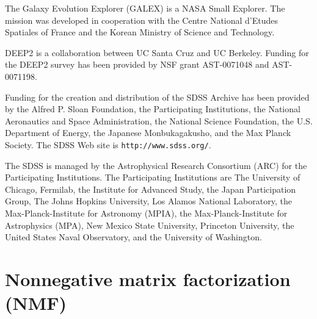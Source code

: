 \documentclass[10pt,preprint]{aastex}
\begin{document}
The Galaxy Evolution Explorer (GALEX) is a NASA Small Explorer. The
mission was developed in cooperation with the Centre National d'Etudes
Spatiales of France and the Korean Ministry of Science and Technology.

DEEP2 is a collaboration between UC Santa Cruz and UC Berkeley.
Funding for the DEEP2 survey has been provided by NSF grant
AST-0071048 and AST-0071198.

Funding for the creation and distribution of the SDSS Archive has been
provided by the Alfred P. Sloan Foundation, the Participating
Institutions, the National Aeronautics and Space Administration, the
National Science Foundation, the U.S. Department of Energy, the
Japanese Monbukagakusho, and the Max Planck Society. The SDSS Web site
is {\tt http://www.sdss.org/}.

The SDSS is managed by the Astrophysical Research Consortium (ARC) for
the Participating Institutions. The Participating Institutions are The
University of Chicago, Fermilab, the Institute for Advanced Study, the
Japan Participation Group, The Johns Hopkins University, Los Alamos
National Laboratory, the Max-Planck-Institute for Astronomy (MPIA),
the Max-Planck-Institute for Astrophysics (MPA), New Mexico State
University, Princeton University, the United States Naval Observatory,
and the University of Washington.
 



\appendix

\section{Nonnegative matrix factorization (NMF)}
\label{nmf}
\end{document}

